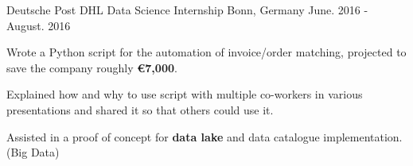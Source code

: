 

\begin{cventries}

  \cventry
    {Deutsche Post DHL} %
    {Data Science Internship} %
    {Bonn, Germany} %
    {June. 2016 - August. 2016} %
    {
      \begin{cvitems} %
        \item{Wrote a Python script for the automation of invoice/order matching, projected to save the company roughly \textbf{€7,000}.}
        \item{Explained how and why to use script with multiple co-workers in various presentations and shared it so that others could use it.}
        \item{Assisted in a proof of concept for \textbf{data lake} and data catalogue implementation. (Big Data)}
      \end{cvitems}
    }

\end{cventries}
